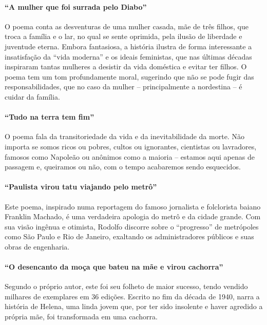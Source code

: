 \paragraph{“A mulher que foi surrada pelo Diabo”}

O poema conta as desventuras de uma mulher casada, mãe de três filhos,
que troca a família e o lar, no qual se sente oprimida, pela ilusão de
liberdade e juventude eterna. Embora fantasiosa, a história ilustra de
forma interessante a insatisfação da “vida moderna” e os ideais
feministas, que nas últimas décadas inspiraram tantas mulheres a
desistir da vida doméstica e evitar ter filhos. O poema tem um tom
profundamente moral, sugerindo que não se pode fugir das
responsabilidades, que no caso da mulher – principalmente a nordestina
– é cuidar da família.

\paragraph{“Tudo na terra tem fim”}

O poema fala da transitoriedade da vida e da inevitabilidade da morte.
Não importa se somos ricos ou pobres, cultos ou ignorantes, cientistas
ou lavradores, famosos como Napoleão ou anônimos como a maioria –
estamos aqui apenas de passagem e, queiramos ou não, com o tempo
acabaremos sendo esquecidos.

\paragraph{“Paulista virou tatu viajando pelo metrô”}

Este poema, inspirado numa reportagem do famoso jornalista e folclorista
baiano Franklin Machado, é uma verdadeira apologia do metrô e da cidade
grande. Com sua visão ingênua e otimista, Rodolfo discorre sobre o
“progresso” de metrópoles como São Paulo e Rio de Janeiro, exaltando os
administradores públicos e suas obras de engenharia.

\paragraph{“O desencanto da moça que bateu na mãe e virou cachorra”}

Segundo o próprio autor, este foi seu folheto de maior sucesso, tendo
vendido milhares de exemplares em 36 edições. Escrito no fim da década
de 1940, narra a história de Helena, uma linda jovem que, por ter sido
insolente e haver agredido a própria mãe, foi transformada em uma
cachorra. 

